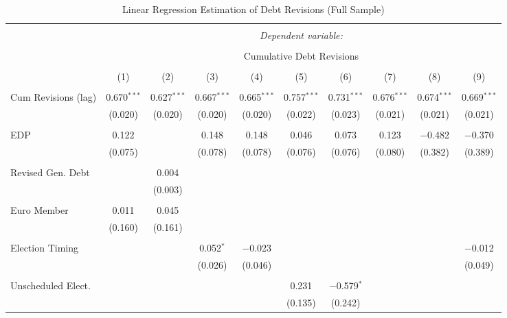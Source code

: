 
\begin{table}[!htbp] \centering 
  \caption{Linear Regression Estimation of Debt Revisions (Full Sample)} 
  \label{debt_results} 
\tiny 
\begin{tabular}{@{\extracolsep{5pt}}lccccccccc} 
\\[-1.8ex]\hline 
\hline \\[-1.8ex] 
 & \multicolumn{9}{c}{\textit{Dependent variable:}} \\ 
\cline{2-10} 
\\[-1.8ex] & \multicolumn{9}{c}{Cumulative Debt Revisions} \\ 
\\[-1.8ex] & (1) & (2) & (3) & (4) & (5) & (6) & (7) & (8) & (9)\\ 
\hline \\[-1.8ex] 
 Cum Revisions (lag) & 0.670$^{***}$ & 0.627$^{***}$ & 0.667$^{***}$ & 0.665$^{***}$ & 0.757$^{***}$ & 0.731$^{***}$ & 0.676$^{***}$ & 0.674$^{***}$ & 0.669$^{***}$ \\ 
  & (0.020) & (0.020) & (0.020) & (0.020) & (0.022) & (0.023) & (0.021) & (0.021) & (0.021) \\ 
  & & & & & & & & & \\ 
 EDP & 0.122 &  & 0.148 & 0.148 & 0.046 & 0.073 & 0.123 & $-$0.482 & $-$0.370 \\ 
  & (0.075) &  & (0.078) & (0.078) & (0.076) & (0.076) & (0.080) & (0.382) & (0.389) \\ 
  & & & & & & & & & \\ 
 Revised Gen. Debt &  & 0.004 &  &  &  &  &  &  &  \\ 
  &  & (0.003) &  &  &  &  &  &  &  \\ 
  & & & & & & & & & \\ 
 Euro Member & 0.011 & 0.045 &  &  &  &  &  &  &  \\ 
  & (0.160) & (0.161) &  &  &  &  &  &  &  \\ 
  & & & & & & & & & \\ 
 Election Timing &  &  & 0.052$^{*}$ & $-$0.023 &  &  &  &  & $-$0.012 \\ 
  &  &  & (0.026) & (0.046) &  &  &  &  & (0.049) \\ 
  & & & & & & & & & \\ 
 Unscheduled Elect. &  &  &  &  & 0.231 & $-$0.579$^{*}$ &  &  &  \\ 
  &  &  &  &  & (0.135) & (0.242) &  &  &  \\ 

\end{tabular}
\end{table}
